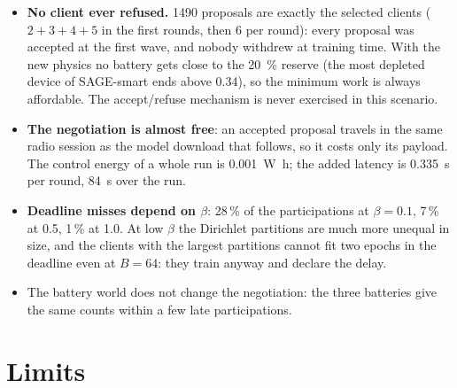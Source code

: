 \documentclass[11pt,a4paper]{article}
\begin{document}
\begin{itemize}
  \item \textbf{No client ever refused.} 1490 proposals are exactly the
        selected clients ($2+3+4+5$ in the first rounds, then 6 per round):
        every proposal was accepted at the first wave, and nobody withdrew at
        training time. With the new physics no battery gets close to the
        \SI{20}{\percent} reserve (the most depleted device of SAGE-smart ends
        above 0.34), so the minimum work is always affordable. The
        accept/refuse mechanism is never exercised in this scenario.
  \item \textbf{The negotiation is almost free}: an accepted proposal travels
        in the same radio session as the model download that follows, so it
        costs only its payload. The control energy of a whole run is
        \SI{0.001}{\watt\hour}; the added latency is \SI{0.335}{\second} per
        round, \SI{84}{\second} over the run.
  \item \textbf{Deadline misses depend on $\beta$}: 28\,\% of the
        participations at $\beta=0.1$, 7\,\% at 0.5, 1\,\% at 1.0. At low
        $\beta$ the Dirichlet partitions are much more unequal in size, and
        the clients with the largest partitions cannot fit two epochs in the
        deadline even at $B=64$: they train anyway and declare the delay.
  \item The battery world does not change the negotiation: the three
        batteries give the same counts within a few late participations.
\end{itemize}

\section{Limits}
\end{document}
